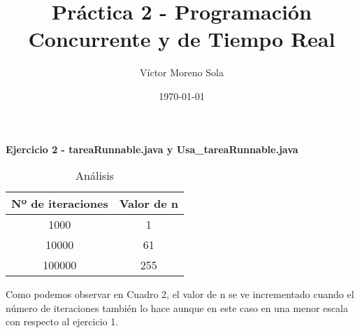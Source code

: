 \documentclass[12pt]{article}
\title{Práctica 2 - Programación Concurrente y de Tiempo Real}
\author{Víctor Moreno Sola}
\date{\today}
\begin{document}
\maketitle

\textbf{Ejercicio 2 - tareaRunnable.java y Usa\_tareaRunnable.java}
    \begin{table}[h!]
        \centering
        \begin{tabular}{c|c}
         Nº de iteraciones & Valor de n \\
         \hline
         1000 & 1 \\
         10000 & 61 \\
         100000 & 255 \\
        \end{tabular}
        \caption{Análisis}
        \label{tab:Tabla 1}
    \end{table}
    
    Como podemos observar en Cuadro 2, el valor de n se ve incrementado cuando el número de iteraciones también lo hace aunque en este caso en una menor escala con respecto al ejercicio 1.
\end{document}
